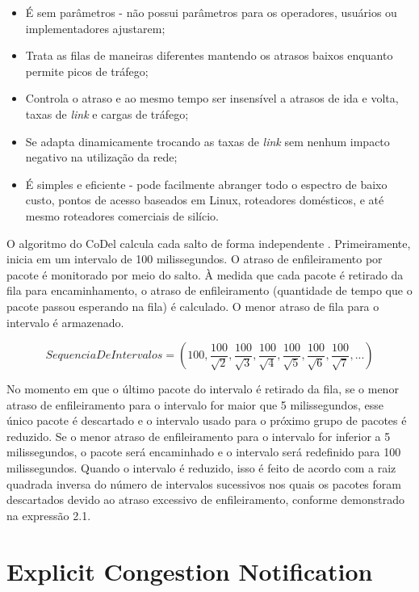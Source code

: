 \begin{itemize}
\item É sem parâmetros - não possui parâmetros para os operadores, usuários ou implementadores ajustarem;
\item Trata as filas de maneiras diferentes mantendo os atrasos baixos enquanto permite picos de tráfego;
\item Controla o atraso e ao mesmo tempo ser insensível a atrasos de ida e volta, taxas de \emph{link} e cargas de tráfego;
\item Se adapta dinamicamente trocando as taxas de \emph{link} sem nenhum impacto negativo na utilização da rede;
\item É simples e eficiente - pode facilmente abranger todo o espectro de baixo custo, pontos de acesso baseados em Linux, roteadores domésticos, e até mesmo roteadores comerciais de silício.
\end{itemize}

O algoritmo do CoDel calcula cada salto de forma independente \cite{nichols2012controlling}. Primeiramente, inicia em um intervalo de 100 milissegundos. O atraso de enfileiramento por pacote é monitorado por meio do salto. À medida que cada pacote é retirado da fila para encaminhamento, o atraso de enfileiramento (quantidade de tempo que o pacote passou esperando na fila) é calculado. O menor atraso de fila para o intervalo é armazenado.

\begin{equation}
Sequencia De Intervalos = (100,\frac{100}{\sqrt2},\frac{100}{\sqrt3},\frac{100}{\sqrt4},\frac{100}{\sqrt5},\frac{100}{\sqrt6},\frac{100}{\sqrt7},...)
\label{eq:CoDel}
\end{equation}

No momento em que o último pacote do intervalo é retirado da fila, se o menor atraso de enfileiramento para o intervalo for maior que 5 milissegundos, esse único pacote é descartado e o intervalo usado para o próximo grupo de pacotes é reduzido. Se o menor atraso de enfileiramento para o intervalo for inferior a 5 milissegundos, o pacote será encaminhado e o intervalo será redefinido para 100 milissegundos. Quando o intervalo é reduzido, isso é feito de acordo com a raiz quadrada inversa do número de intervalos sucessivos nos quais os pacotes foram descartados devido ao atraso excessivo de enfileiramento, conforme demonstrado na expressão 2.1.


\section{Explicit Congestion Notification}

